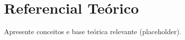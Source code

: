 \section{Referencial Teórico}\label{sec:ref-teorico}
Apresente conceitos e base teórica relevante (placeholder).
